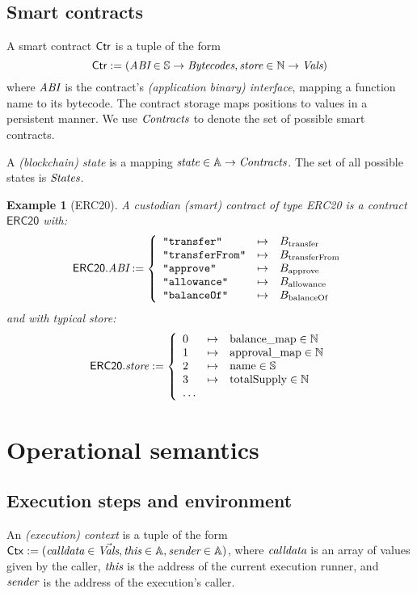 \documentclass[12pt]{extarticle}
\newtheorem{example}{Example}
\begin{document}
\subsection{Smart contracts}
A smart contract $\mathsf{Ctr}$ is a tuple of the form $$\mathsf{Ctr}:=(\textit{ABI}\in \mathbb{S}\to \textit{Bytecodes}, \textit{store}\in \mathbb{N}\to \textit{Vals})$$ where $\textit{ABI}$ is the contract's \emph{(application binary) interface}, mapping a function name to its bytecode. The contract storage maps positions to values in a persistent manner. We use $\textit{Contracts}$ to denote the set of possible smart contracts.

A \emph{(blockchain) state} is a mapping $\textit{state}\in \mathbb{A}\to\textit{Contracts}$. The set of all possible states is $\textit{States}$.

\begin{example}[ERC20]
A custodian (smart) contract of type ERC20 is a contract $\mathsf{ERC20}$ with:
$$
\mathsf{ERC20}.\textit{ABI} := \left\{
\begin{array}{lll}
\hbox{\rm\texttt{"transfer"}} &\mapsto& B_{\textrm{transfer}}\\
\hbox{\rm\texttt{"transferFrom"}} &\mapsto& B_{\textrm{transferFrom}}\\
\hbox{\rm\texttt{"approve"}}&\mapsto& B_{\textrm{approve}} \\
\hbox{\rm\texttt{"allowance"}}&\mapsto& B_{\textrm{allowance}} \\
\hbox{\rm\texttt{"balanceOf"}}&\mapsto& B_{\textrm{balanceOf}}
\end{array}\right.
$$
and with typical store:
$$
\mathsf{ERC20}.\textit{store} := \left\{
\begin{array}{lll}
0 &\mapsto& \textrm{balance\_map}\in \mathbb{N} \\
1 &\mapsto& \textrm{approval\_map}\in \mathbb{N} \\
2 & \mapsto& \textrm{name}\in \mathbb{S} \\
3 & \mapsto& \textrm{totalSupply}\in\mathbb{N} \\
\dots
\end{array}\right.
$$

\end{example}

\section{Operational semantics}

\subsection{Execution steps and environment}

An \emph{(execution) context} is a tuple of the form $\mathsf{Ctx}:=(\textit{calldata}\in\vec{\textit{Vals}},\textit{this}\in\mathbb{A},\textit{sender}\in\mathbb{A})$, 
where $\textit{calldata}$ is an array of values given by the caller, $\textit{this}$ is the address of the current execution runner, 
and $\textit{sender}$ is the address of the execution's caller. 
\end{document}
